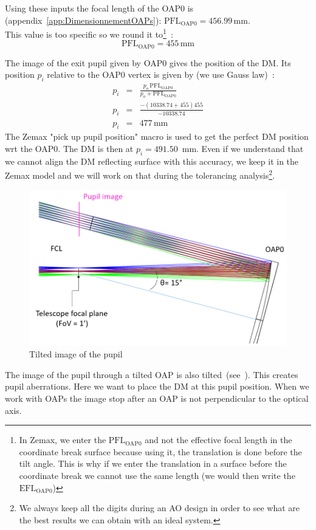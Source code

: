 \documentclass[12pt,a4paper]{article}
\begin{document}
Using these inputs the focal length of the OAP0 is (appendix~\ref{app:DimensionnementOAPs}): $\text{PFL}_{\text{OAP0}} = 456.99\,\text{mm}	\nonumber$.\\
This value is too specific so we round it to\footnote{In Zemax, we enter the $\text{PFL}_{\text{OAP0}}$ and not the effective focal length in the coordinate break surface because using it, the translation is done before the tilt angle. This is why if we enter the translation in a surface before the coordinate break we cannot use the same length (we would then write the $\text{EFL}_{\text{OAP0}}$)}~:
\begin{equation}
	\text{PFL}_{\text{OAP0}} = 455\,\text{mm}	\nonumber
\end{equation}

The image of the exit pupil given by OAP0 gives the position of the DM. Its position $p_i$ relative to the OAP0 vertex is given by (we use Gauss law)~:
\begin{eqnarray}
	p_i &= &\frac{p_o\,\text{PFL}_{\text{OAP0}}}{p_o+\text{PFL}_{\text{OAP0}}}\\
	p_i &= &\frac{-(10338.74+455)455}{-10338.74}\\
	p_i &= &477\,\text{mm}
\end{eqnarray}
The Zemax "pick up pupil position" macro is used to get the perfect DM position wrt the OAP0. The DM is then at $p_i = 491.50$~mm. Even if we understand that we cannot align the DM reflecting surface with this accuracy, we keep it in the Zemax model and we will work on that during the tolerancing analysis\footnote{We always keep all the digits during an AO design in order to see what are the best results we can obtain with an ideal system.}. \\

\begin{figure}
  \vspace{-1cm}
  \centering
  \includegraphics[width=\linewidth]{images/DM_pupil_tilt.PNG}
  \caption{Tilted image of the pupil}\label{fig:DM_pupil_tilt}
\end{figure}
The image of the pupil through a tilted OAP is also tilted~(see~\cite{cite:Design90degOAP}). This creates pupil aberrations. Here we want to place the DM at this pupil position. When we work with OAPs the image stop after an OAP is not perpendicular to the optical axis.\\
\end{document}
